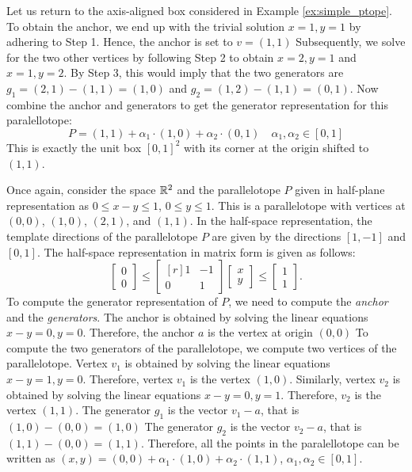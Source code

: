 \begin{example}
Let us return to the axis-aligned box considered in Example \ref{ex:simple_ptope}.
%
To obtain the anchor, we end up with the trivial solution $x = 1, y=1$ by adhering to Step 1. Hence, the anchor is set to $v = (1,1)$
%
Subsequently, we solve for the two other vertices by following Step 2 to obtain $x=2, y= 1$ and $x=1,y=2$.
%
By Step 3, this would imply that the two generators are $g_1 = (2,1)-(1,1) = (1,0)$ and $g_2 = (1,2)-(1,1) = (0,1)$.
%
Now combine the anchor and generators to get the generator representation for this paralellotope:
%
\begin{equation}
 P = (1,1) + \alpha_1\cdot(1,0) + \alpha_2\cdot(0,1) \quad \alpha_1, \alpha_2 \in [0,1]
\end{equation}
%
This is exactly the unit box $[0,1]^2$ with its corner at the origin shifted to $(1,1)$.
\end{example}
%
\begin{example}
\label{ex:diag_ptope}
Once again, consider the space ${\mathbb{R}}^2$ and the parallelotope $P$ given in half-plane representation as $0 \leq x-y \leq 1$, $0 \leq y \leq 1$.
%
This is a parallelotope with vertices at $(0,0)$, $(1,0)$, $(2,1)$, and $(1,1)$.
%
In the half-space representation, the template directions of the parallelotope $P$ are given by the directions $[1, -1]$ and $[0, 1]$.
%
The half-space representation in matrix form is given as follows:
%
\begin{equation}
  \begin{bmatrix} 0 \\ 0 \end{bmatrix} \leq \begin{bmatrix*}[r]  1 & -1 \\ 0 &  1 \end{bmatrix*}  \begin{bmatrix} x \\ y \end{bmatrix} \leq \begin{bmatrix} 1 \\ 1 \end{bmatrix}. \label{eq:ptopeexample}
\end{equation}
%
To compute the generator representation of $P$, we need to compute the \emph{anchor} and the \emph{generators}.
%
The anchor is obtained by solving the linear equations $x-y = 0, y = 0$.
%
Therefore, the anchor $a$ is the vertex at origin $(0,0)$
%
To compute the two generators of the parallelotope, we compute two vertices of the parallelotope.
%
Vertex $v_1$ is obtained by solving the linear equations $x - y = 1, y = 0$.
%
Therefore, vertex $v_1$ is the vertex $(1,0)$.
%
Similarly, vertex $v_2$ is obtained by solving the linear equations $x-y = 0, y = 1$.
%
Therefore, $v_2$ is the vertex $(1,1)$.
%
The generator $g_1$ is the vector $v_1 - a$, that is $(1,0)- (0,0) = (1,0)$
%
The generator $g_2$ is the vector $v_2 - a$, that is $(1,1) - (0,0) = (1,1)$.
%
Therefore, all the points in the paralellotope can be written as $(x,y) = (0,0) + \alpha_1 \cdot (1,0) + \alpha_2\cdot (1,1)$, $\alpha_1, \alpha_2 \in [0,1]$.
\end{example}
